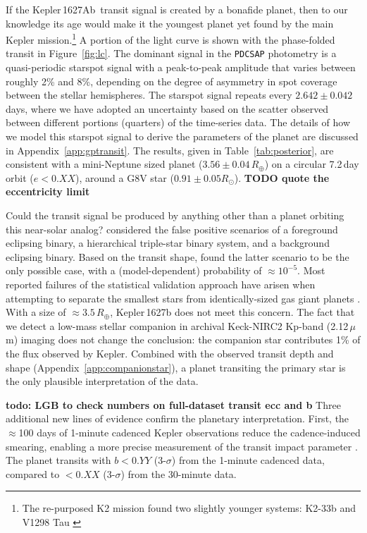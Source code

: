 \documentclass[12pt,modern,twocolumn,tighten]{aastex63}
\newcommand{\pn}{Kepler\,1627Ab} %
\begin{document}

If the \pn\ transit signal is created by a bonafide planet,  then to
our knowledge its age would make it the youngest planet yet found by
the main Kepler mission.\footnote{The re-purposed K2 mission found two
slightly younger systems: K2-33b
\citep{David_et_al_2017,Mann_K2_33b_2016} and V1298 Tau
\citep{david_four_2019}}  A portion of the light curve is shown with
the phase-folded transit in Figure~\ref{fig:lc}.  The dominant signal
in the \texttt{PDCSAP} photometry is a quasi-periodic starspot signal
with a peak-to-peak amplitude that varies between roughly 2\% and 8\%,
depending on the degree of asymmetry in spot coverage between the
stellar hemispheres.  The starspot signal repeats every
$2.642\pm0.042$\,days, where we have adopted an uncertainty based on
the scatter observed between different portions (quarters) of the
time-series data.  The details of how we model this starspot signal to
derive the parameters of the planet are discussed in
Appendix~\ref{app:gptransit}.  The results, given in
Table~\ref{tab:posterior}, are consistent with a mini-Neptune sized
planet ($3.56\pm 0.04\,R_\oplus$) on a circular 7.2\,day orbit
($e<0.XX$), around a G8V star ($0.91 \pm 0.05 R_\odot$).  {\bf TODO
quote the eccentricity limit}

Could the transit signal be produced by anything other than a planet
orbiting this near-solar analog?  \citet{morton_false_2016} considered
the false positive scenarios of a foreground eclipsing binary, a
hierarchical triple-star binary system, and a background eclipsing
binary.  Based on the transit shape, \citet{morton_false_2016} found
the latter scenario to be the only possible case, with a
(model-dependent) probability of $\approx10^{-5}$. Most
reported failures of the statistical validation approach have arisen when attempting
to separate the smallest stars from identically-sized gas giant
planets \citep[{\it e.g.},][]{shporer_three_2017}.  With a size of $\approx 3.5\,R_\oplus$, Kepler\,1627b does
not meet this concern.  The fact that we detect a low-mass stellar
companion in archival Keck-NIRC2 Kp-band (2.12\,$\mu $m) imaging does
not change the conclusion: the companion star contributes 1\% of the
flux observed by Kepler.  Combined with the observed transit depth and
shape (Appendix~\ref{app:companionstar}), a planet transiting the
primary star is the only plausible interpretation of the
data.

{\bf todo: LGB to check numbers on full-dataset transit ecc and b} 
Three additional new lines of evidence confirm the planetary
interpretation.  First, the $\approx$100 days of 1-minute
cadenced Kepler observations reduce the cadence-induced smearing,
enabling a more precise measurement of the transit impact parameter
\citep{kipping_binning_2010}.  The planet transits with $b<0.YY$
(3-$\sigma$) from the 1-minute cadenced data, compared to $<0.XX$
(3-$\sigma$) from the 30-minute data.
\end{document}
